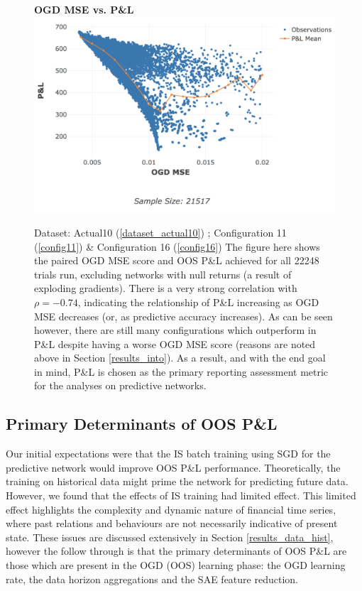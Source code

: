 \documentclass[a4paper,11pt,oneside]{article}
\theoremstyle{plain}
\theoremstyle{definition}
\begin{document}
		\begin{figure}[H]
		\textbf{OGD MSE vs. P\&L}
		\centering
		\includegraphics[scale=0.45]{images/results/intro/ogdmse_pl.png}
		\caption[OGD MSE vs. OOS P\&L]
		{Dataset: Actual10 (\ref{dataset_actual10}) ; Configuration 11 (\ref{config11}) \&  Configuration 16 (\ref{config16}) \newline 
			The figure here shows the paired OGD MSE score and OOS P\&L achieved for all 22248 trials run, excluding networks with null returns (a result of exploding gradients). There is a very strong correlation with $\rho = -0.74$, indicating the relationship of P\&L increasing as OGD MSE decreases (or, as predictive accuracy increases). As can be seen however, there are still many configurations which outperform in P\&L despite having a worse OGD MSE score (reasons are noted above in Section \ref{results_into}). As a result, and with the end goal in mind, P\&L is chosen as the primary reporting assessment metric for the analyses on predictive networks. }
		\label{figure-ogdmse_pl}
	\end{figure}
	
	\newpage
	\subsection{Primary Determinants of OOS P\&L}\label{results_oos_pl}
	
	Our initial expectations were that the IS batch training using SGD for the predictive network would improve OOS P\&L performance. Theoretically, the training on historical data might prime the network for predicting future data. However, we found that the effects of IS training had limited effect. This limited effect highlights the complexity and dynamic nature of financial time series, where past relations and behaviours are not necessarily indicative of present state. These issues are discussed extensively in Section \ref{results_data_hist}, however the follow through is that the primary determinants of OOS P\&L are those which are present in the OGD (OOS) learning phase: the OGD learning rate, the data horizon aggregations and the SAE feature reduction.\newline
	
\end{document}
